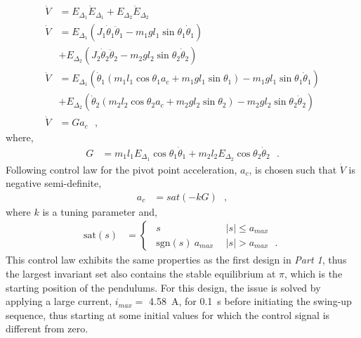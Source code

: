 \begin{align}
  \dot{V} &= E_{\Delta_1} \dot{E}_{\Delta_1} + E_{\Delta_2} \dot{E}_{\Delta_2}
  \label{eq:lyapunovDerivativeTwin1} \\ 
  \dot{V} &=
  E_{\Delta_1} ( J_1 \dot{\theta}_1 \ddot{\theta}_1 - m_1 g l_1 \sin \theta_1 \dot{\theta}_1 )  \nonumber \\
  &+
  E_{\Delta_2} ( J_2 \dot{\theta}_2 \ddot{\theta}_2 - m_2 g l_2 \sin \theta_2 \dot{\theta}_2 ) 
  \label{eq:lyapunovDerivativeTwin2} \\
  \dot{V} &= E_{\Delta_1} ( \dot{\theta}_1 ( m_1 l_1 \cos \theta_1 a_c + m_1 g l_1 \sin \theta_1 )  - m_1 g l_1 \sin \theta_1 \dot{\theta}_1 ) \nonumber \\
  &+
  E_{\Delta_2} ( \dot{\theta}_2 ( m_2 l_2 \cos \theta_2 a_c + m_2 g l_2 \sin \theta_2 )  - m_2 g l_2 \sin \theta_2 \dot{\theta}_2 )
  \label{eq:lyapunovDerivativeTwin3} \\
  \dot{V} &= G a_c   \ \ \ ,  \label{eq:lyapunovDerivativeTwin4}
\end{align}
%
where,
\begin{align}
  G &= m_1 l_1 E_{\Delta_1} \cos \theta_1 \dot{\theta}_1 +  m_2 l_2 E_{\Delta_2} \cos \theta_2 \dot{\theta}_2  \ \ \ .  \label{eq:lyapunovDerivativeTwinG}
\end{align}
Following control law for the pivot point acceleration, $a_c$, is chosen such that $\dot{V}$ is negative semi-definite,
\begin{align}
  a_c &= sat( -k G ) \ \ \ ,  \label{eq:twinSwingControl1}
\end{align}
where $k$ is a tuning parameter and,
\begin{align}
  \text{sat}(s) &=
  \begin{cases}
    \ \ s                           & \ \  | s |  \leq a_{max} \\
    \ \ \mathrm{sgn}( s )\ a_{max}  & \ \  | s |  >  a_{max} \ \ \ .
  \end{cases}
  \label{eq:satuationFunctionTwin}
\end{align}
%
This control law exhibits the same properties as the first design in \textit{Part 1}, thus the largest invariant set also contains the stable equilibrium at $\pi$, which is the starting position of the pendulums. For this design, the issue is solved by applying a large current, $i_{max}=$ \SI{4.58}{A}, for \SI{0.1}{s} before initiating the swing-up sequence, thus starting at some initial values for which the control signal is different from zero.\\
